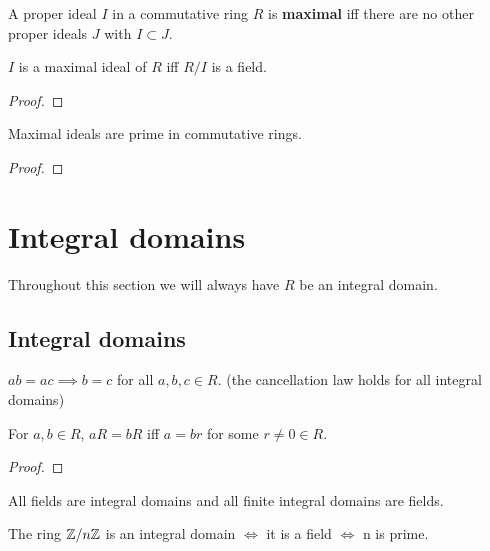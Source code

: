 \documentclass[../Year2.tex]{subfiles}
\begin{document}
\begin{definition}
    A proper ideal $I$ in a commutative ring $R$ is \textbf{maximal} iff there are no other proper ideals $J$ with $I\subset J$.
\end{definition}

\begin{theorem}
    $I$ is a maximal ideal of $R$ iff $R/I$ is a field.
    \begin{proof}
        
    \end{proof}
\end{theorem}

\begin{corollary}
    Maximal ideals are prime in commutative rings. \begin{proof}
        
    \end{proof}
\end{corollary}

\section{Integral domains}
Throughout this section we will always have $R$ be an integral domain.

\subsection{Integral domains}

\begin{theorem}
    $ab=ac\implies b=c$ for all $a,b,c\in R$. (the cancellation law holds for all integral domains)
\end{theorem}

\begin{proposition}
    For $a,b\in R$, $aR=bR$ iff $a=br$ for some $r\neq 0 \in R$.
    \begin{proof}
        
    \end{proof}
\end{proposition}

\begin{theorem}
    All fields are integral domains and all finite integral domains are fields.
\end{theorem}

\begin{remark}
    The ring $\mathbb{Z}/n\mathbb{Z}$ is an integral domain $\iff$ it is a field $\iff$ n is prime.
\end{remark}
\end{document}
